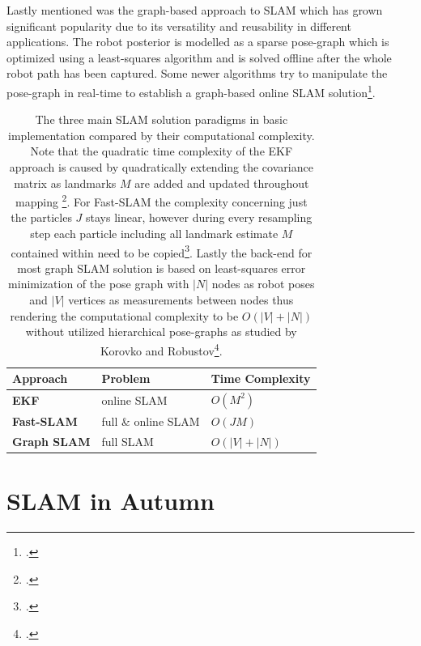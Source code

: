 Lastly mentioned was the graph-based approach to SLAM which has grown significant popularity due to its versatility and reusability in different applications. The robot posterior is modelled as a sparse pose-graph which is optimized using a least-squares algorithm and is solved offline after the whole robot path has been captured. Some newer algorithms try to manipulate the pose-graph in real-time to establish a graph-based online SLAM solution\footcite{stachniss2016simultaneous}.


\begin{table}[]
	\centering
	\begin{tabular}{|l|l|l|}
		\hline
		\textbf{Approach}   & \textbf{Problem}    & \textbf{Time Complexity} \\ \hline
		\textbf{EKF}        & online SLAM         & $O(M^{2})$               \\ \hline
		\textbf{Fast-SLAM}  & full \& online SLAM & $O(J M)$                 \\ \hline
		\textbf{Graph SLAM} & full  SLAM          & $O(|V| + |N|)$           \\ \hline
	\end{tabular}
	\caption{The three main SLAM solution paradigms in basic implementation compared by their computational complexity. Note that the quadratic time complexity of the EKF approach is caused by quadratically extending the covariance matrix as landmarks $M$ are added and updated throughout mapping \footcite{durrantSlam2006}.
	For Fast-SLAM the complexity concerning just the particles $J$ stays linear, however during every resampling step each particle including all landmark estimate $M$ contained within need to be copied\footcite{montemerlo2002fastslam}.
	Lastly the back-end for most graph SLAM solution is based on least-squares error minimization of the pose graph with $|N|$ nodes as robot poses and $|V|$ vertices as measurements between nodes thus rendering the computational complexity to be  $O(|V| + |N|)$ without utilized hierarchical pose-graphs as studied by Korovko and Robustov\footcite{korovko2021partial}. 
}
	\label{tab:slamComparison}
\end{table}

\section{SLAM in Autumn}

